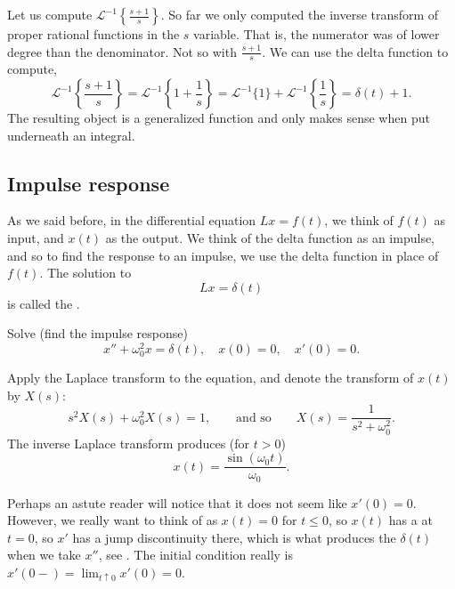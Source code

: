 \begin{example}
Let us compute ${\mathcal{L}}^{-1} \left\{ \frac{s+1}{s} \right\}$.  So
far we only computed the inverse transform of proper rational functions
in the $s$ variable.
That is, the numerator was of lower degree than the denominator.
Not so with $\frac{s+1}{s}$.
We can use the delta function to compute,
\begin{equation*}
{\mathcal{L}}^{-1} \left\{ \frac{s+1}{s} \right\}
=
{\mathcal{L}}^{-1} \left\{ 1 + \frac{1}{s} \right\}
=
{\mathcal{L}}^{-1} \{ 1 \}
+
{\mathcal{L}}^{-1} \left\{ \frac{1}{s} \right\}
=
\delta(t) + 1 .
\end{equation*}
The resulting object is a generalized
function and only makes sense when put underneath an integral.
\end{example}

\subsection{Impulse response}

As we said before, in the differential equation
$L x = f(t)$,
we think of $f(t)$ as input, and $x(t)$ as the output.
We think of the delta function as an impulse, and so
to find the response to an impulse, we use
the delta function in place of $f(t)$.
The solution to
\begin{equation*}
L x = \delta(t)
\end{equation*}
is called the
\emph{}.

\begin{example}
Solve (find the impulse response)
\begin{equation} \label{eq:lteximpulseresp}
x'' + \omega_0^2 x = \delta(t) , \quad x(0) = 0, \quad x'(0) = 0 .
\end{equation}

Apply the Laplace transform to the equation, and denote
the transform of $x(t)$ by $X(s)$:
\begin{equation*}
s^2 X(s) + \omega_0^2 X(s) = 1 ,
\qquad \text{and so} \qquad
X(s) = \frac{1}{s^2+ \omega_0^2} .
\end{equation*}
The inverse Laplace transform produces (for $t > 0$)
\begin{equation*}
x(t) = 
\frac{\sin (\omega_0 t)}{\omega_0} .
\end{equation*}
\end{example}

\begin{remark}
Perhaps an astute reader will notice that it does not seem like $x'(0)=0$.
However, we really want to think of as $x(t)=0$ for $t \leq 0$, so $x(t)$
has a  at $t=0$, so $x'$ has a jump discontinuity there,
which is what produces the $\delta(t)$ when we take $x''$,
see .
The initial condition really is $x'(0-) = \lim_{t \uparrow 0} x'(0) = 0$.
\end{remark}

